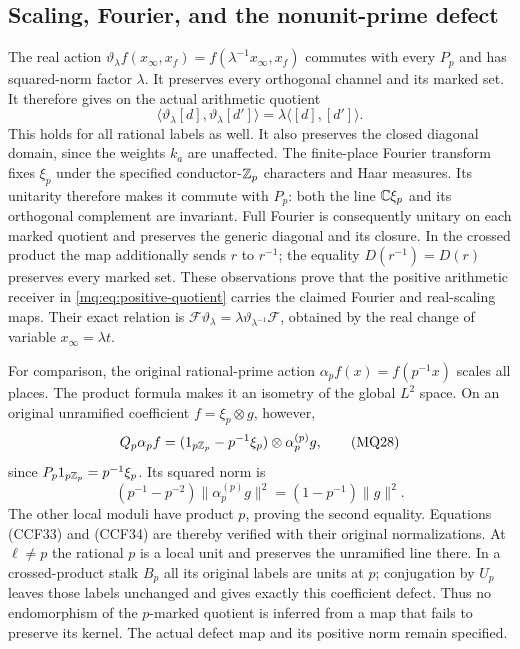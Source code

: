 \subsection{Scaling, Fourier, and the nonunit-prime defect}

The real action $\vartheta_\lambda f(x_\infty,x_f)
=f(\lambda^{-1}x_\infty,x_f)$ commutes with every $P_p$ and
has squared-norm factor $\lambda$. It preserves every orthogonal
channel and its marked set. It therefore gives on the actual
arithmetic quotient
\[
 \langle\vartheta_\lambda[d],\vartheta_\lambda[d']\rangle
       =\lambda\langle[d],[d']\rangle.
 \tag{MQ27}\label{mq:eq:scaling}
\]
This holds for all rational labels as well. It also preserves the
closed diagonal domain, since the weights $k_a$ are unaffected.
The finite-place Fourier transform fixes $\xi_p$ under the
specified conductor-$\mathbb Z_p$ characters and Haar measures. Its
unitarity therefore makes it commute with $P_p$: both the line
$\mathbb C\xi_p$ and its orthogonal complement are invariant. Full
Fourier is consequently unitary on each marked quotient and
preserves the generic diagonal and its closure. In the crossed
product the map additionally sends $r$ to $r^{-1}$; the equality
$D(r^{-1})=D(r)$ preserves every marked set. These observations
prove that the positive arithmetic receiver in
\eqref{mq:eq:positive-quotient} carries the claimed Fourier and
real-scaling maps. Their exact relation is
$\mathcal F\vartheta_\lambda
=\lambda\vartheta_{\lambda^{-1}}\mathcal F$, obtained by the
real change of variable $x_\infty=\lambda t$.

For comparison, the original rational-prime action
$\alpha_pf(x)=f(p^{-1}x)$ scales all places. The product formula
makes it an isometry of the global $L^2$ space. On an original
unramified coefficient $f=\xi_p\otimes g$, however,
\[
 Q_p\alpha_pf=
 (1_{p\mathbb Z_p}-p^{-1}\xi_p)\otimes\alpha_p^{(p)}g,
 \tag{MQ28}\label{mq:eq:prime-defect}
\]
since $P_p1_{p\mathbb Z_p}=p^{-1}\xi_p$. Its squared norm is
\[
 (p^{-1}-p^{-2})\|\alpha_p^{(p)}g\|^2
       =(1-p^{-1})\|g\|^2.
 \tag{MQ29}\label{mq:eq:defect-norm}
\]
The other local moduli have product $p$, proving the second
equality. Equations (CCF33) and (CCF34) are thereby verified with their original
normalizations. At $\ell\ne p$ the rational $p$ is a local
unit and preserves the unramified line there. In a crossed-product
stalk $B_p$ all its original labels are units at $p$; conjugation
by $U_p$ leaves those labels unchanged and gives exactly this
coefficient defect. Thus no endomorphism of the $p$-marked
quotient is inferred from a map that fails to preserve its kernel.
The actual defect map and its positive norm remain specified.

